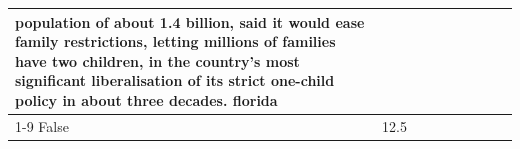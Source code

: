 \begin{table}[H]
\begin{tabular}{lllrlllll}
population of about 1.4 billion, said it would ease family restrictions, letting millions of families have two children, in the country's most significant liberalisation of its strict one-child policy in about three decades. florida \\
\cline{1-9}
False & 12.5%
\end{tabular}
\end{table}
